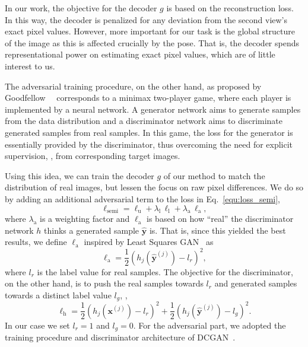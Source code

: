 \documentclass[10pt,twocolumn,letterpaper]{article}
\begin{document}
In our work, the objective for the decoder $g$ is based on the reconstruction loss.
In this way, the decoder is penalized for any deviation 
from the second view's exact pixel values.
However, more important for our task is the global structure of the image
as this is affected crucially by the pose.
That is, the decoder spends representational power on estimating exact pixel values,  
which are of little interest to us.

The adversarial training procedure, on the other hand, 
as proposed by Goodfellow~\etal~\cite{Goodfellow2014nips_gan}
corresponds to a minimax two-player game, where each player is implemented by a neural network.
A generator network aims to generate samples from the data distribution and a 
discriminator network aims to discriminate generated samples from real samples.
In this game, the loss for the generator is essentially provided by the discriminator,
thus overcoming the need for explicit supervision, \eg, from corresponding target images.

Using this idea, we can train the decoder $g$ of our method to match the distribution of 
real images, but lessen the focus on raw pixel differences. %
We do so by adding an additional adversarial term 
to the loss in Eq.~\eqref{equ:loss_semi},
\begin{equation}
  \ell_{\mathrm{semi}} = \ell_{\mathrm{u}} + \lambda_{\mathrm{l}} \, \ell_{\mathrm{l}}
			+ \lambda_{\mathrm{a}} \, \ell_{\mathrm{a}},
\end{equation}
where $\lambda_{\mathrm{a}}$ is a weighting factor and 
$\ell_{\mathrm{a}}$ is based on how ``real'' the discriminator network $h$ 
thinks a generated sample $\mathbf{\hat{y}}$ is.
That is, since this yielded the best results,
we define $\ell_{\mathrm{a}}$ inspired by Least Squares GAN~\cite{Mao2017iccv_lsgan} as
\begin{equation}
 \ell_{\mathrm{a}} = \frac{1}{2} \left( h_{j} ( \mathbf{\hat{y}}^{(j)} ) - l_{r} \right)^{2},
\end{equation}
where $l_{r}$ is the label value for real samples.
The objective for the discriminator, on the other hand, is to push 
the real samples towards $l_{r}$ and 
generated samples towards a distinct label value $l_{g}$, \ie,
\begin{equation}
 \ell_{\mathrm{h}} = \frac{1}{2} \left( h_{j} ( \mathbf{x}^{(j)} ) - l_{r} \right)^{2}
		   + \frac{1}{2} \left( h_{j} ( \mathbf{\hat{y}}^{(j)} ) - l_{g} \right)^{2}.
\end{equation}
In our case we set $l_{r} = 1$ and $l_{g} = 0$.
For the adversarial part, we adopted the training procedure and discriminator architecture of 
DCGAN~\cite{Radford2016iclr_dcgan}.
\end{document}

